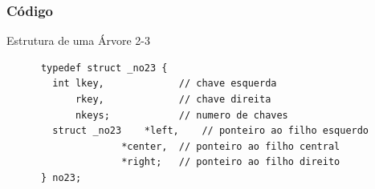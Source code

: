 \documentclass[cyan,compress,aspectratio=43]{beamer}
\begin{document}




\begin{frame}[fragile]
\frametitle{Código}
  \vspace{-0.3cm}
  \begin{block}{Estrutura de uma Árvore 2-3}
    \begin{lstlisting}
	  typedef struct _no23 {
	    int	lkey,             // chave esquerda
		    rkey,             // chave direita
		    nkeys;            // numero de chaves
	    struct _no23	*left,    // ponteiro ao filho esquerdo
				    *center,  // ponteiro ao filho central
				    *right;   // ponteiro ao filho direito
	  } no23;
    \end{lstlisting}
  \end{block}
\end{frame}
\end{document}
